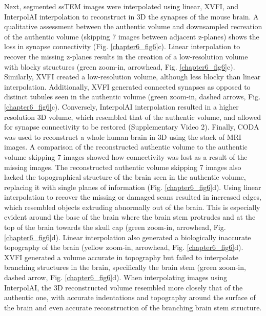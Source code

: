 \begin{refsection}
    Next, segmented ssTEM images were interpolated using linear, XVFI, and InterpolAI interpolation to reconstruct in 3D the synapses of the mouse brain. A qualitative assessment between the authentic volume and downsampled recreation of the authentic volume (skipping 7 images between adjacent z-planes) shows the loss in synapse connectivity (Fig. \ref{chapter6_fig6}c). Linear interpolation to recover the missing z-planes results in the creation of a low-resolution volume with blocky structures (green zoom-in, arrowhead, Fig. \ref{chapter6_fig6}c). Similarly, XVFI created a low-resolution volume, although less blocky than linear interpolation. Additionally, XVFI generated connected synapses as opposed to distinct tubules seen in the authentic volume (green zoom-in, dashed arrows, Fig. \ref{chapter6_fig6}c). Conversely, InterpolAI interpolation resulted in a higher resolution 3D volume, which resembled that of the authentic volume, and allowed for synapse connectivity to be restored (Supplementary Video 2).
    Finally, CODA was used to reconstruct a whole human brain in 3D using the stack of MRI images. A comparison of the reconstructed authentic volume to the authentic volume skipping 7 images showed how connectivity was lost as a result of the missing images. The reconstructed authentic volume skipping 7 images also lacked the topographical structure of the brain seen in the authentic volume, replacing it with single planes of information (Fig. \ref{chapter6_fig6}d). Using linear interpolation to recover the missing or damaged scans resulted in increased edges, which resembled objects extruding abnormally out of the brain. This is especially evident around the base of the brain where the brain stem protrudes and at the top of the brain towards the skull cap (green zoom-in, arrowhead, Fig. \ref{chapter6_fig6}d). Linear interpolation also generated a biologically inaccurate topography of the brain (yellow zoom-in, arrowhead, Fig. \ref{chapter6_fig6}d). XVFI generated a volume accurate in topography but failed to interpolate branching structures in the brain, specifically the brain stem (green zoom-in, dashed arrow, Fig. \ref{chapter6_fig6}d). When interpolating images using InterpolAI, the 3D reconstructed volume resembled more closely that of the authentic one, with accurate indentations and topography around the surface of the brain and even accurate reconstruction of the branching brain stem structure. 

\end{refsection}
